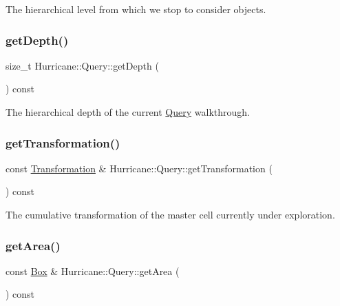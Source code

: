 The hierarchical level from which we stop to consider objects. \mbox{\label{classHurricane_1_1Query_afb81080617e5b4d3c2bedf1bf8b2ebd8}} 
\subsubsection{\texorpdfstring{get\+Depth()}{getDepth()}}
{\footnotesize\ttfamily size\+\_\+t Hurricane\+::\+Query\+::get\+Depth (\begin{DoxyParamCaption}{ }\end{DoxyParamCaption}) const\hspace{0.3cm}{\ttfamily [inline]}}

The hierarchical depth of the current \mbox{\hyperlink{classHurricane_1_1Query}{Query}} walkthrough. \mbox{\label{classHurricane_1_1Query_aabe2c0588f95c30a3acfec8fed269be4}} 
\subsubsection{\texorpdfstring{get\+Transformation()}{getTransformation()}}
{\footnotesize\ttfamily const \mbox{\hyperlink{classHurricane_1_1Transformation}{Transformation}} \& Hurricane\+::\+Query\+::get\+Transformation (\begin{DoxyParamCaption}{ }\end{DoxyParamCaption}) const\hspace{0.3cm}{\ttfamily [inline]}}

The cumulative transformation of the master cell currently under exploration. \mbox{\label{classHurricane_1_1Query_a666c44432d3f5717f2fee5f57a281bdd}} 
\subsubsection{\texorpdfstring{get\+Area()}{getArea()}}
{\footnotesize\ttfamily const \mbox{\hyperlink{classHurricane_1_1Box}{Box}} \& Hurricane\+::\+Query\+::get\+Area (\begin{DoxyParamCaption}{ }\end{DoxyParamCaption}) const\hspace{0.3cm}{\ttfamily [inline]}}

